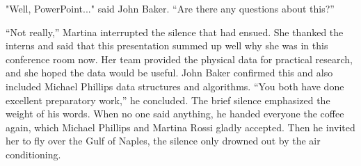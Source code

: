 \documentclass[
]{article}
\begin{document}
"Well, PowerPoint..." said John Baker. ``Are there any questions about
this?''

``Not really,'' Martina interrupted the silence that had ensued. She
thanked the interns and said that this presentation summed up well why
she was in this conference room now. Her team provided the physical data
for practical research, and she hoped the data would be useful. John
Baker confirmed this and also included Michael
Phillips\textquotesingle{} data structures and algorithms. ``You both
have done excellent preparatory work,'' he concluded. The brief silence
emphasized the weight of his words. When no one said anything, he handed
everyone the coffee again, which Michael Phillips and Martina Rossi
gladly accepted. Then he invited her to fly over the Gulf of Naples, the
silence only drowned out by the air conditioning.
\end{document}
